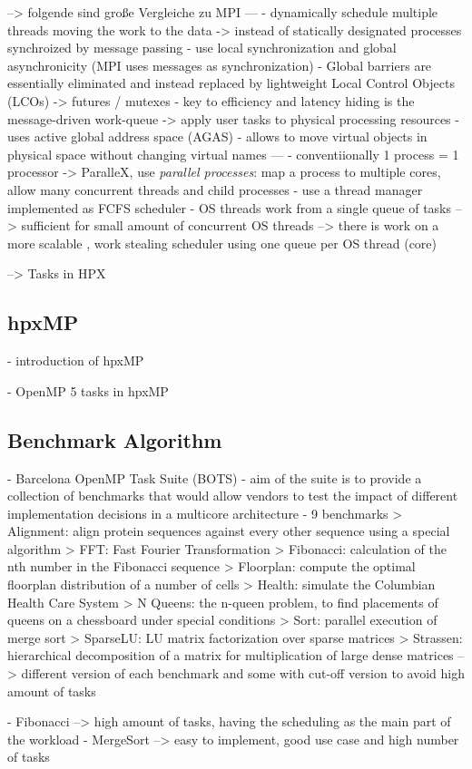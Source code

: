 --> folgende sind große Vergleiche zu MPI ---
    - dynamically schedule multiple threads moving the work to the data
     -> instead of statically designated processes synchroized by message passing
    - use local synchronization and global asynchronicity (MPI uses messages as synchronization)
    - Global barriers are essentially eliminated and instead replaced by
lightweight Local Control Objects (LCOs) -> futures / mutexes
    - key to efficiency and latency hiding is the message-driven work-queue
	  -> apply user tasks to physical processing resources
	- uses active global address space (AGAS)
	  - allows to move virtual objects in physical space without changing virtual names
	  ---
	- conventiionally 1 process = 1 processor
	  -> ParalleX, use \textit{parallel processes}: map a process to multiple cores, allow many concurrent threads and child processes
	- use a thread manager implemented as FCFS scheduler 
	  - OS threads work from a single queue of tasks 
	  --> sufficient for small amount of concurrent OS threads
	  --> there is work on a more scalable , work stealing scheduler using one queue per OS thread (core)
	  

--> Tasks in HPX

\subsection{hpxMP}
\cite{TianyiZhang.2019}
- introduction of hpxMP

\cite{Zhang.2192020}
- OpenMP 5 tasks in hpxMP


    
\subsection{Benchmark Algorithm}
- Barcelona OpenMP Task Suite (BOTS)
	- aim of the suite is to provide a collection of benchmarks that would allow vendors to test the impact of different implementation decisions in a multicore architecture
	- 9 benchmarks
		> Alignment: align protein sequences against every other sequence using a special algorithm
		> FFT: Fast Fourier Transformation
		> Fibonacci: calculation of the nth number in the Fibonacci sequence
		> Floorplan: compute the optimal floorplan distribution of a number of cells
		> Health: simulate the Columbian Health Care System
		> N Queens: the n-queen problem, to find placements of queens on a chessboard under special conditions
		> Sort: parallel execution of merge sort
		> SparseLU: LU matrix factorization over sparse matrices
		> Strassen: hierarchical decomposition of a matrix for multiplication of large dense matrices
	--> different version of each benchmark and some with cut-off version to avoid high amount of tasks
	

	- Fibonacci --> high amount of tasks, having the scheduling as the main part of the workload
	- MergeSort --> easy to implement, good use case and high number of tasks
	
